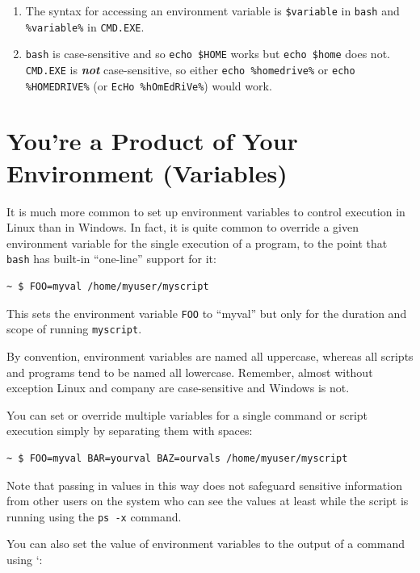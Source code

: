 \documentclass[10pt,]{book}
\numberwithin{figure}{chapter}
\begin{document}
\begin{enumerate}
\def\labelenumi{\arabic{enumi}.}
\item
  The syntax for accessing an environment variable is
  \texttt{\$variable} in \texttt{bash} and \texttt{\%variable\%} in
  \texttt{CMD.EXE}.
\item
  \texttt{bash} is case-sensitive and so \texttt{echo \$HOME} works but
  \texttt{echo \$home} does not. \texttt{CMD.EXE} is \textbf{\emph{not}}
  case-sensitive, so either \texttt{echo \%homedrive\%} or
  \texttt{echo \%HOMEDRIVE\%} (or \texttt{EcHo \%hOmEdRiVe\%}) would
  work.
\end{enumerate}

\section{You're a Product of Your Environment
(Variables)}\label{youre-a-product-of-your-environment-variables}

It is much more common to set up environment variables to control
execution in Linux than in Windows. In fact, it is quite common to
override a given environment variable for the single execution of a
program, to the point that \texttt{bash} has built-in ``one-line''
support for it:

\begin{verbatim}
~ $ FOO=myval /home/myuser/myscript
\end{verbatim}

This sets the environment variable \texttt{FOO} to ``myval'' but only
for the duration and scope of running \texttt{myscript}.

By convention, environment variables are named all uppercase, whereas
all scripts and programs tend to be named all lowercase. Remember,
almost without exception Linux and company are case-sensitive and
Windows is not.

You can set or override multiple variables for a single command or
script execution simply by separating them with spaces:

\begin{verbatim}
~ $ FOO=myval BAR=yourval BAZ=ourvals /home/myuser/myscript
\end{verbatim}

Note that passing in values in this way does not safeguard sensitive
information from other users on the system who can see the values at
least while the script is running using the \texttt{ps -x} command.

You can also set the value of environment variables to the output of a
command using `:
\end{document}
